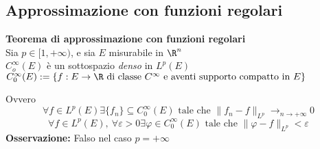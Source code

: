 \subsection{Approssimazione con funzioni regolari}
\begin{tcolorbox}
	\textbf{Teorema di approssimazione con funzioni regolari}\\
	Sia $p\in[1,+\infty)$, e sia $E$ misurabile in $\R^n$
	\\$C_o^\infty(E)$ è un sottospazio \textit{denso} in $L^p(E)$
	\\$C_0^\infty(E):=\{f:E\to \R\text{ di classe }C^\infty \text{ e aventi supporto compatto in }E\}$ 
\end{tcolorbox}
Ovvero 
\[\forall f\in L^p(E) \exists \{f_n\} \subseteq C_0^\infty(E)\text{ tale che }\|f_n-f\|_{L^p}\to_{n\to +\infty}0\]
\[\forall f\in L^p(E),\ \forall \varepsilon>0 \exists \varphi\in C_0^\infty(E)\text{ tale che }\|\varphi-f\|_{L^p}<\varepsilon\]
\textbf{Osservazione:} Falso nel caso $p=+\infty$


